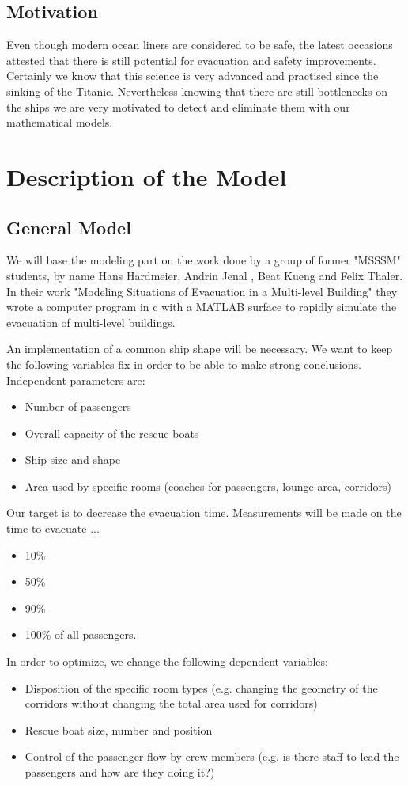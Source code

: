 \documentclass[11pt]{article}
\begin{document}
\subsection{Motivation}
Even though modern ocean liners are considered to be safe, the latest occasions attested that there is still potential for evacuation and safety improvements.\cite{concordia} Certainly we know that this science is very advanced and practised since the sinking of the Titanic. Nevertheless knowing that there are still bottlenecks on the ships we are very motivated to detect and eliminate them with our mathematical models.

\section{Description of the Model}
\subsection{General Model}

We will base the modeling part on the work done by a group of former "MSSSM" students, by name Hans Hardmeier, Andrin Jenal , Beat Kueng and Felix Thaler. \cite{Building} In their work "Modeling Situations of Evacuation in a Multi-level Building" they wrote a computer program in c with a MATLAB surface to rapidly simulate the evacuation of multi-level buildings.

An implementation of a common ship shape will be necessary.\cite{shipdecks} We want to keep the following variables fix in order to be able to make strong conclusions.
Independent parameters are:
\begin{itemize}
\item Number of passengers
\item Overall capacity of the rescue boats
\item Ship size and shape
\item Area used by specific rooms (coaches for passengers, lounge area, corridors)
\end{itemize}
Our target is to decrease the evacuation time. Measurements will be made on the time to evacuate ...
\begin{itemize}
\item 10\%
\item 50\%
\item 90\%
\item100\% of all passengers.
\end{itemize}
In order to optimize, we change the following dependent variables:
\begin{itemize}
\item Disposition of the specific room types (e.g. changing the geometry of the corridors without changing the total area used for corridors)
\item Rescue boat size, number and position
\item Control of the passenger flow by crew members (e.g. is there staff to lead the passengers and how are they doing it?)
\end{itemize}
\end{document}
